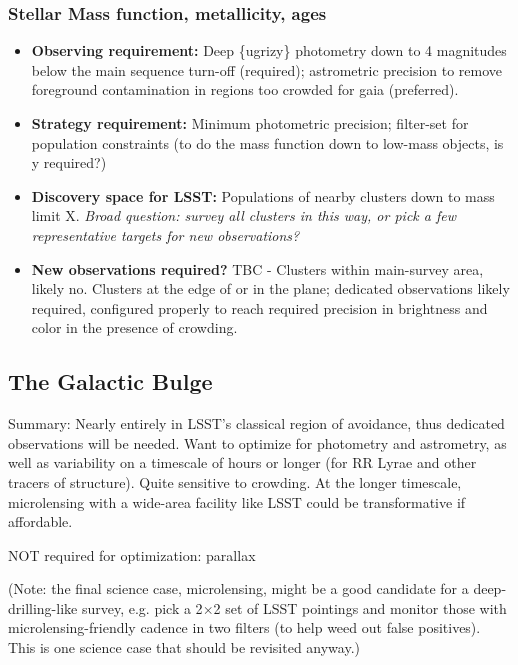 \subsubsection{Stellar Mass function, metallicity, ages}
\vspace{-2mm}
\begin{itemize}
\item {\bf Observing requirement:} Deep \{ugrizy\} photometry down to 4 magnitudes below the main sequence turn-off (required); astrometric precision to remove foreground contamination in regions too crowded for gaia (preferred).
\vspace{-2mm}

\item {\bf Strategy requirement:} Minimum photometric precision; filter-set for population constraints (to do the mass function down to low-mass objects, is y required?)
\vspace{-2mm}

\item {\bf Discovery space for LSST:} Populations of nearby clusters down to mass limit X. {\it Broad question: survey all clusters in this way, or pick a few representative targets for new observations?}
\vspace{-2mm}

\item {\bf New observations required?} TBC - Clusters within main-survey area, likely no. Clusters at the edge of or in the plane; dedicated observations likely required, configured properly to reach required precision in brightness and color in the presence of crowding.
\vspace{-2mm}
\end{itemize}

\subsection{The Galactic Bulge}

Summary: Nearly entirely in LSST’s classical region of avoidance, thus
dedicated observations will be needed. Want to optimize for photometry
and astrometry, as well as variability on a timescale of hours or
longer (for RR Lyrae and other tracers of structure). Quite sensitive
to crowding. At the longer timescale, microlensing with a wide-area
facility like LSST could be transformative if affordable.

NOT required for optimization: parallax

(Note: the final science case, microlensing, might be a good candidate
for a deep-drilling-like survey, e.g. pick a 2$\times$2 set of LSST
pointings and monitor those with microlensing-friendly cadence in two
filters (to help weed out false positives). This is one science case
that should be revisited anyway.)


